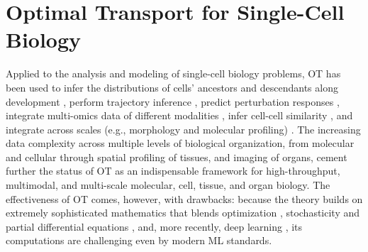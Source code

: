 
\section{Optimal Transport for Single-Cell Biology}
\label{sec:related_work_bio}
\label{sec:ot_for_biology}

Applied to the analysis and modeling of single-cell biology problems, OT has been used to infer the distributions of cells' ancestors and descendants along development \citep{schiebinger2019optimal}, perform trajectory inference \citep{bunne2022proximal, forrow2021lineageot, bunne2022recovering, lavenant2021towards, schiebinger2019optimal, tong2020trajectorynet, yang2020predicting, zhang2021optimal, chizat2022trajectory}, predict perturbation responses \citep{bunne2021learning, yang2018scalable, lubeck2022neural}, integrate multi-omics data of different modalities \citep{demetci2022scot}, infer cell-cell similarity \citep{huizing2022optimal}, and integrate across scales (e.g., morphology and molecular profiling) \citep{yang2021multi}. The increasing data complexity across multiple levels of biological organization, from molecular and cellular through spatial profiling \citep{moriel2021novosparc} of tissues, and imaging of organs, cement further the status of OT as an indispensable framework for high-throughput, multimodal, and multi-scale molecular, cell, tissue, and organ biology. The effectiveness of OT comes, however, with drawbacks: because the theory builds on extremely sophisticated mathematics that blends optimization \citep{cuturi2013sinkhorn, cuturi2022optimal}, stochasticity \citep{chizat2022trajectory, bunne2022recovering} and partial differential equations \citep{bunne2022proximal}, and, more recently, deep learning \citep{tong2020trajectorynet, bunne2021learning, bunne2022supervised, yang2018scalable, lubeck2022neural, yang2021multi}, its computations are challenging even by modern ML standards.
